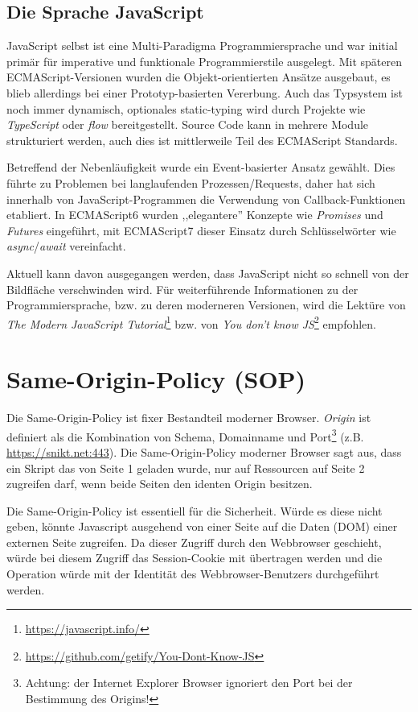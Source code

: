 \subsection{Die Sprache JavaScript}

JavaScript selbst ist eine Multi-Paradigma Programmiersprache und war initial primär für imperative und funktionale Programmierstile ausgelegt. Mit späteren ECMAScript-Versionen wurden die Objekt-orientierten Ansätze ausgebaut, es blieb allerdings bei einer Prototyp-basierten Vererbung. Auch das Typsystem ist noch immer dynamisch, optionales static-typing wird durch Projekte wie \textit{TypeScript} oder \textit{flow} bereitgestellt. Source Code kann in mehrere Module strukturiert werden, auch dies ist mittlerweile Teil des ECMAScript Standards.

Betreffend der Nebenläufigkeit wurde ein Event-basierter Ansatz gewählt. Dies führte zu Problemen bei langlaufenden Prozessen/Requests, daher hat sich innerhalb von JavaScript-Programmen die Verwendung von Callback-Funktionen etabliert. In ECMAScript6 wurden ,,elegantere'' Konzepte wie \textit{Promises} und \textit{Futures} eingeführt, mit ECMAScript7 dieser Einsatz durch Schlüsselwörter wie \textit{async}/\textit{await} vereinfacht.

Aktuell kann davon ausgegangen werden, dass JavaScript nicht so schnell von der Bildfläche verschwinden wird. Für weiterführende Informationen zu der Programmiersprache, bzw. zu deren moderneren Versionen, wird die Lektüre von \textit{The Modern JavaScript Tutorial}\footnote{\url{https://javascript.info/}} bzw. von \textit{You don't know JS}\footnote{\url{https://github.com/getify/You-Dont-Know-JS}} empfohlen.

\section{Same-Origin-Policy (SOP)}

Die Same-Origin-Policy ist fixer Bestandteil moderner Browser. \textit{Origin} ist definiert als die Kombination von Schema, Domainname und Port\footnote{Achtung: der Internet Explorer Browser ignoriert den Port bei der Bestimmung des Origins!} (z.B. \url{https://snikt.net:443}). Die Same-Origin-Policy moderner Browser sagt aus, dass ein Skript das von Seite 1 geladen wurde, nur auf Ressourcen auf Seite 2 zugreifen darf, wenn beide Seiten den identen Origin besitzen.

Die Same-Origin-Policy ist essentiell für die Sicherheit. Würde es diese nicht geben, könnte Javascript ausgehend von einer Seite auf die Daten (DOM) einer externen Seite zugreifen. Da dieser Zugriff durch den Webbrowser geschieht, würde bei diesem Zugriff das Session-Cookie mit übertragen werden und die Operation würde mit der Identität des Webbrowser-Benutzers durchgeführt werden.

